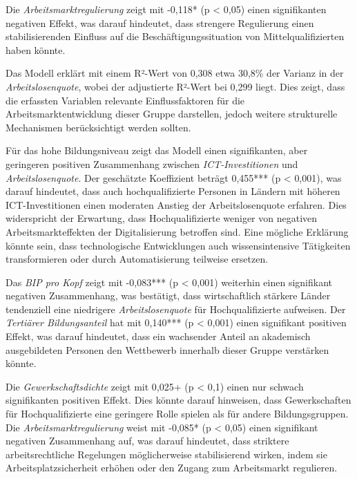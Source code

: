 Die \textit{Arbeitsmarktregulierung} zeigt mit -0,118* (p < 0,05) einen signifikanten 
negativen Effekt, was darauf hindeutet, dass strengere Regulierung einen stabilisierenden 
Einfluss auf die Beschäftigungssituation von Mittelqualifizierten haben könnte. 

Das Modell erklärt mit einem R²-Wert von 0,308 etwa 30,8\% der Varianz in der 
\textit{Arbeitslosenquote}, wobei der adjustierte R²-Wert bei 0,299 liegt. Dies zeigt, 
dass die erfassten Variablen relevante Einflussfaktoren für die Arbeitsmarktentwicklung 
dieser Gruppe darstellen, jedoch weitere strukturelle Mechanismen berücksichtigt werden 
sollten.

Für das hohe Bildungsniveau zeigt das Modell einen signifikanten, aber geringeren 
positiven Zusammenhang zwischen \textit{\ac{ICT}-Investitionen} und 
\textit{Arbeitslosenquote}. Der geschätzte Koeffizient beträgt 0,455*** (p < 0,001), 
was darauf hindeutet, dass auch hochqualifizierte Personen in Ländern mit höheren 
\ac{ICT}-Investitionen einen moderaten Anstieg der Arbeitslosenquote erfahren. Dies 
widerspricht der Erwartung, dass Hochqualifizierte weniger von negativen 
Arbeitsmarkteffekten der Digitalisierung betroffen sind. Eine mögliche Erklärung könnte 
sein, dass technologische Entwicklungen auch wissensintensive Tätigkeiten transformieren 
oder durch Automatisierung teilweise ersetzen.

Das \textit{\ac{BIP} pro Kopf} zeigt mit -0,083*** (p < 0,001) weiterhin einen signifikant 
negativen Zusammenhang, was bestätigt, dass wirtschaftlich stärkere Länder tendenziell eine 
niedrigere \textit{Arbeitslosenquote} für Hochqualifizierte aufweisen. Der \textit{Tertiärer 
Bildungsanteil} hat mit 0,140*** (p < 0,001) einen signifikant positiven Effekt, was darauf 
hindeutet, dass ein wachsender Anteil an akademisch ausgebildeten Personen den Wettbewerb 
innerhalb dieser Gruppe verstärken könnte.

Die \textit{Gewerkschaftsdichte} zeigt mit 0,025+ (p < 0,1) einen nur schwach signifikanten 
positiven Effekt. Dies könnte darauf hinweisen, dass Gewerkschaften für Hochqualifizierte 
eine geringere Rolle spielen als für andere Bildungsgruppen. Die 
\textit{Arbeitsmarktregulierung} weist mit -0,085* (p < 0,05) einen signifikant negativen 
Zusammenhang auf, was darauf hindeutet, dass striktere arbeitsrechtliche Regelungen 
möglicherweise stabilisierend wirken, indem sie Arbeitsplatzsicherheit erhöhen oder den 
Zugang zum Arbeitsmarkt regulieren.

